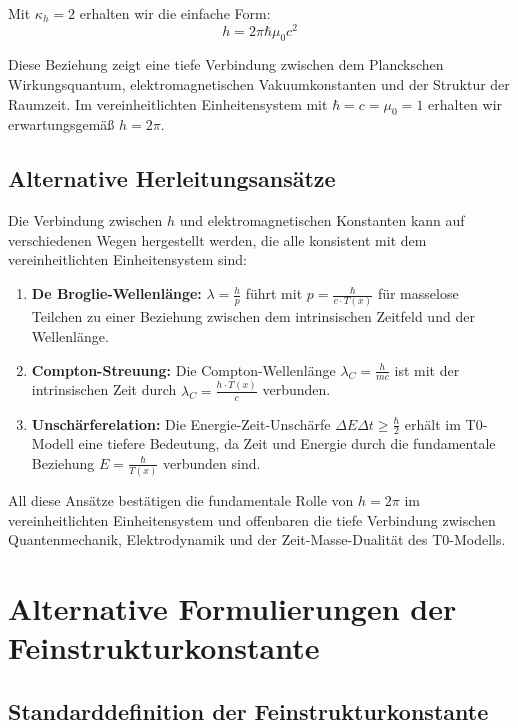 \documentclass[12pt,a4paper]{article}
\newcommand{\Tfield}{T(x)}
\begin{document}
	Mit \(\kappa_h = 2\) erhalten wir die einfache Form:
	\begin{equation}
		h = 2\pi\hbar \mu_0 c^2
	\end{equation}
	
	Diese Beziehung zeigt eine tiefe Verbindung zwischen dem Planckschen Wirkungsquantum, elektromagnetischen Vakuumkonstanten und der Struktur der Raumzeit. Im vereinheitlichten Einheitensystem mit \(\hbar = c = \mu_0 = 1\) erhalten wir erwartungsgemäß \(h = 2\pi\).
	
	\subsection{Alternative Herleitungsansätze}
	
	Die Verbindung zwischen \(h\) und elektromagnetischen Konstanten kann auf verschiedenen Wegen hergestellt werden, die alle konsistent mit dem vereinheitlichten Einheitensystem sind:
	
	\begin{enumerate}
		\item \textbf{De Broglie-Wellenlänge:} \(\lambda = \frac{h}{p}\) führt mit \(p = \frac{\hbar}{c \cdot \Tfield}\) für masselose Teilchen zu einer Beziehung zwischen dem intrinsischen Zeitfeld und der Wellenlänge.
		\item \textbf{Compton-Streuung:} Die Compton-Wellenlänge \(\lambda_C = \frac{h}{mc}\) ist mit der intrinsischen Zeit durch \(\lambda_C = \frac{h \cdot \Tfield}{c}\) verbunden.
		\item \textbf{Unschärferelation:} Die Energie-Zeit-Unschärfe \(\Delta E \Delta t \geq \frac{\hbar}{2}\) erhält im T0-Modell eine tiefere Bedeutung, da Zeit und Energie durch die fundamentale Beziehung \(E = \frac{\hbar}{\Tfield}\) verbunden sind.
	\end{enumerate}
	
	All diese Ansätze bestätigen die fundamentale Rolle von \(h = 2\pi\) im vereinheitlichten Einheitensystem und offenbaren die tiefe Verbindung zwischen Quantenmechanik, Elektrodynamik und der Zeit-Masse-Dualität des T0-Modells.
	
	\section{Alternative Formulierungen der Feinstrukturkonstante}
	
	\subsection{Standarddefinition der Feinstrukturkonstante}
	
\end{document}

